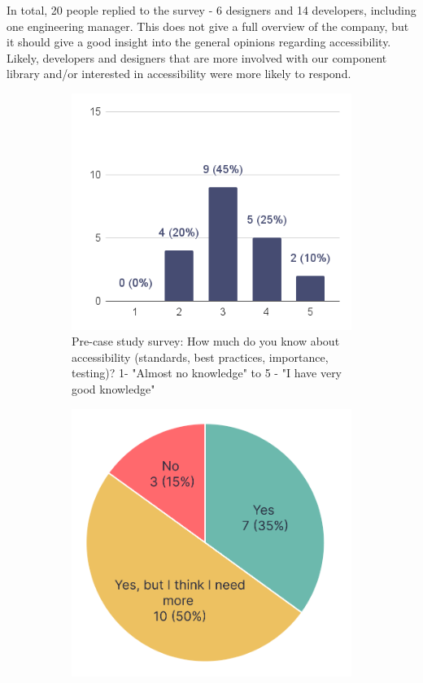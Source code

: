 \documentclass{master_thesis}
\begin{document}
In total, 20 people replied to the survey - 6 designers and 14 developers, including one engineering manager. This does not give a full overview of the company, but it should give a good insight into the general opinions regarding accessibility. Likely, developers and designers that are more involved with our component library and/or interested in accessibility were more likely to respond.

\begin{figure}[H]
    \centering
	\begin{subfigure}{0.5\textwidth}
		\includegraphics[width=\textwidth]{img/a11y-knowledge.png}
		\caption{Pre-case study survey: How much do you know about accessibility (standards, best practices, importance, testing)? 1- "Almost no knowledge" to 5 - "I have very good knowledge" }
		\label{fig:a11y-knowledge-current}
	\end{subfigure}
	\hspace{0.05\textwidth}
	\begin{subfigure}{0.4\textwidth}
		\includegraphics[width=\textwidth]{img/a11y-resources.png}

\end{subfigure}
\end{figure}
\end{document}
